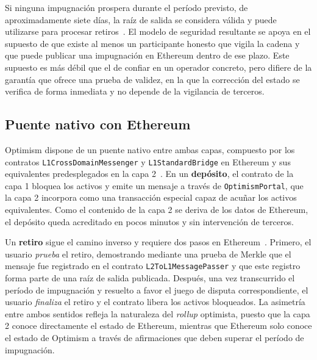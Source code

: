 Si ninguna impugnación prospera durante el período previsto, de aproximadamente siete días, la
raíz de salida se considera válida y puede utilizarse para procesar retiros~\cite{optimismfaultproofs}.
El modelo de seguridad resultante se apoya en el supuesto de que existe al menos un participante
honesto que vigila la cadena y que puede publicar una impugnación en Ethereum dentro de ese plazo.
Este supuesto es más débil que el de confiar en un operador concreto, pero difiere de la
garantía que ofrece una prueba de validez, en la que la corrección del estado se verifica de forma
inmediata y no depende de la vigilancia de terceros.

\subsection{Puente nativo con Ethereum}
\label{sec:op_puente_nativo}

Optimism dispone de un puente nativo entre ambas capas, compuesto por los contratos
\texttt{L1CrossDomainMessenger} y \texttt{L1StandardBridge} en Ethereum y sus equivalentes
predesplegados en la capa 2~\cite{opspecsoverview}. En un \textbf{depósito}, el contrato de la
capa 1 bloquea los activos y emite un mensaje a través de \texttt{OptimismPortal}, que la capa 2
incorpora como una transacción especial capaz de acuñar los activos equivalentes. Como el
contenido de la capa 2 se deriva de los datos de Ethereum, el depósito queda acreditado en pocos
minutos y sin intervención de terceros.

Un \textbf{retiro} sigue el camino inverso y requiere dos pasos en
Ethereum~\cite{opspecswithdrawals}. Primero, el usuario \textit{prueba} el retiro, demostrando
mediante una prueba de Merkle que el mensaje fue registrado en el contrato
\texttt{L2ToL1MessagePasser} y que este registro forma parte de una raíz de salida publicada.
Después, una vez transcurrido el período de impugnación y resuelto a favor el juego de disputa
correspondiente, el usuario \textit{finaliza} el retiro y el contrato libera los activos
bloqueados. La asimetría entre ambos sentidos refleja la naturaleza del \textit{rollup}
optimista, puesto que la capa 2 conoce directamente el estado de Ethereum, mientras que Ethereum
solo conoce el estado de Optimism a través de afirmaciones que deben superar el período de
impugnación.

